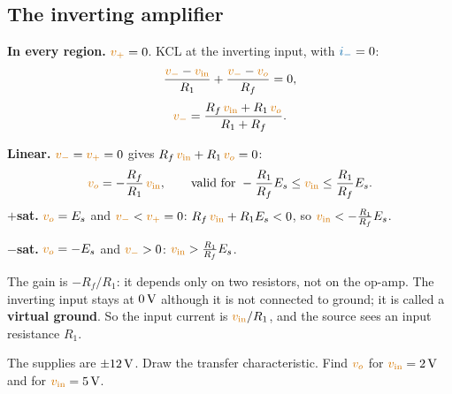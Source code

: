 \documentclass[11pt,a4paper]{article}
\newcommand{\Icol}[1]{\textcolor{ccur}{#1}}
\newcommand{\Vcol}[1]{\textcolor{cvolt}{#1}}
\newif\ifsolfirst
\newcommand{\solution}{\par\smallskip\noindent{\color{cpow}\bfseries Solution}\par\nobreak\smallskip\global\solfirsttrue}
\newcommand{\kohm}{\,\mathrm{k}\Omega}
\newcommand{\vin}{\Vcol{v_{\mathrm{in}}}}
\newcommand{\vo}{\Vcol{v_o}}
\newcommand{\vp}{\Vcol{v_+}}
\newcommand{\vm}{\Vcol{v_-}}
\newcommand{\im}{\Icol{i_-}}
\newcommand{\Es}{E_s}
\newcommand{\invAmp}[3]{%
  \node[oa] (A) at (0,0) {};
  \draw (A.-) -- ++(-0.4,0) coordinate (n) to[R, l_=#1] ++(-2.0,0) coordinate (s);
  \draw (s) to[american voltage source, l_=#3] ($(s)+(0,-1.8)$) node[ground] {};
  \draw (n) -- ++(0,1.3) coordinate (f) to[R, l=#2] (f -| A.out) -- (A.out);
  \draw (A.+) -- ++(-0.4,0) -- ++(0,-0.4) node[ground] {};
  \draw (A.out) -- ++(0.8,0) node[ocirc] {} node[right, font=\small, text=cvolt] {$v_o$};
  \fill (n) circle (1.6pt); \fill (A.out) circle (1.6pt);}
\begin{document}
\subsection{The inverting amplifier}

\begin{minipage}[c]{0.46\linewidth}
\centering
{}
\end{minipage}\hfill
\begin{minipage}[c]{0.5\linewidth}
\textbf{In every region.} $\vp = 0$. KCL at the inverting input, with $\im = 0$:
\[
  \frac{\vm - \vin}{R_1} + \frac{\vm - \vo}{R_f} = 0 ,
\]
\[
  \vm = \frac{R_f\,\vin + R_1\,\vo}{R_1 + R_f} .
\]
\end{minipage}

\textbf{Linear.} $\vm = \vp = 0$ gives $R_f\,\vin + R_1\,\vo = 0$:
\[
  \vo = -\frac{R_f}{R_1}\,\vin , \qquad \text{valid for } -\frac{R_1}{R_f}\Es \leq \vin \leq \frac{R_1}{R_f}\Es .
\]
\textbf{$+$sat.} $\vo = \Es$ and $\vm < \vp = 0$: $R_f\,\vin + R_1\Es < 0$, so $\vin < -\frac{R_1}{R_f}\Es$.

\textbf{$-$sat.} $\vo = -\Es$ and $\vm > 0$: $\vin > \frac{R_1}{R_f}\Es$.

The gain is $-R_f/R_1$: it depends only on two resistors, not on the op-amp. The inverting
input stays at $0\,\mathrm{V}$ although it is not connected to ground; it is called a \textbf{virtual
ground}. So the input current is $\vin/R_1$, and the source sees an input resistance $R_1$.

\bigskip
\begin{examplebox}
\begin{minipage}[c]{0.46\linewidth}
\centering
{}
\end{minipage}\hfill
\begin{minipage}[c]{0.5\linewidth}
The supplies are $\pm 12\,\mathrm{V}$. Draw the transfer characteristic. Find $\vo$ for
$\vin = 2\V$ and for $\vin = 5\V$.
\end{minipage}
\end{examplebox}

\solution
\end{document}
